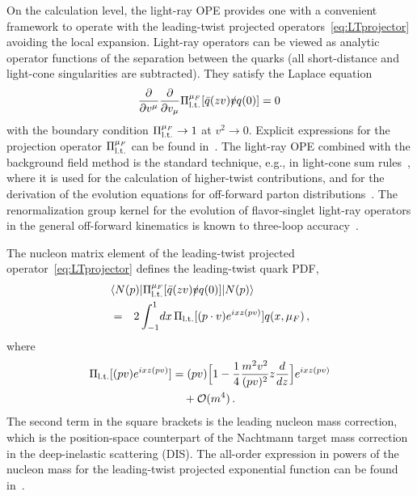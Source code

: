 \documentclass[aps,prd,twocolumn,a4paper,superscriptaddress,10pt,showpacs,notitlepage,floatfix]{revtex4-1}
\begin{document}
On the calculation level, the light-ray OPE provides one with a convenient framework to operate with the leading-twist projected operators~\eqref{eq:LTprojector} avoiding the local expansion. Light-ray operators can be viewed as analytic operator functions of the separation 
between the quarks (all short-distance and light-cone singularities are subtracted). They satisfy the Laplace 
equation~\cite{Balitsky:1987bk}
\begin{align}
 \frac{\partial}{\partial v^\mu} \frac{\partial}{\partial v_\mu}  \Pi_{\rm l.t.}^{\mu_F}[\bar q (z v ) \slashed{v} q(0)] =0\,
\end{align}
with the boundary condition $\Pi_{\rm l.t.}^{\mu_F}\to 1 $ at $v^2 \to 0$. 
Explicit expressions for the projection operator $\Pi_{\rm l.t.}^{\mu_F}$ can be 
found in~\cite{Balitsky:1987bk,Geyer:1999uq,Geyer:2000ig,Braun:2011dg}. 
The light-ray OPE combined with the background field method is the standard technique, e.g., 
in light-cone sum rules~\cite{Balitsky:1989ry}, where it is used for the calculation of higher-twist contributions, 
and for the derivation of the evolution equations for off-forward parton distributions~\cite{Belitsky:1999hf,Belitsky:1998gc}. 
The renormalization group kernel for the evolution of flavor-singlet light-ray operators in the general off-forward kinematics 
is known to three-loop accuracy~\cite{Braun:2017cih}. 

The nucleon matrix element of the leading-twist projected operator~\eqref{eq:LTprojector} defines the leading-twist 
quark PDF,
\begin{eqnarray}
\lefteqn{ \langle N(p)| \Pi_{\rm l.t.}^{\mu_F}[\bar q (zv) \slashed{v} q(0)] |N(p)\rangle}
\notag\\ 
&=& 2 \int_{-1}^1\!dx\, \Pi_{\rm l.t.}[(p\cdot v) e^{ i x z (pv)}] q(x,\mu_F)\,, 
\end{eqnarray}
where~\cite{Balitsky:1990ck} 
\begin{align}
\label{Pi-exp}
\Pi_{\rm l.t.}[(pv) e^{ i x z(pv)}]
&= (pv)\Big[1 - \frac{1}{4} \frac{m^2 v^2}{(pv)^2} z\frac{d}{dz} \Big] e^{ ixz(pv)}
\nonumber\\&\quad
+ \mathcal{O}(m^4)\,. 
\end{align}
The second term in the square brackets is the leading nucleon mass correction,  which is the position-space counterpart of the Nachtmann target mass correction~\cite{Nachtmann:1973mr} in the deep-inelastic scattering (DIS). The all-order expression in powers of the nucleon mass for the leading-twist projected exponential function can be found in~\cite{Balitsky:1990ck}.
\end{document}
